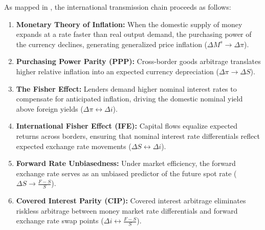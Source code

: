 As mapped in , the international transmission chain proceeds as follows:
\begin{enumerate}[leftmargin=*, label=\arabic*.]
    \item \textbf{Monetary Theory of Inflation:} When the domestic supply of money expands at a rate faster than real output demand, the purchasing power of the currency declines, generating generalized price inflation ($\Delta M^s \to \Delta \pi$).
    \item \textbf{Purchasing Power Parity (PPP):} Cross-border goods arbitrage translates higher relative inflation into an expected currency depreciation ($\Delta \pi \to \Delta S$).
    \item \textbf{The Fisher Effect:} Lenders demand higher nominal interest rates to compensate for anticipated inflation, driving the domestic nominal yield above foreign yields ($\Delta \pi \leftrightarrow \Delta i$).
    \item \textbf{International Fisher Effect (IFE):} Capital flows equalize expected returns across borders, ensuring that nominal interest rate differentials reflect expected exchange rate movements ($\Delta S \leftrightarrow \Delta i$).
    \item \textbf{Forward Rate Unbiasedness:} Under market efficiency, the forward exchange rate serves as an unbiased predictor of the future spot rate ($\Delta S \to \frac{F-S}{S}$).
    \item \textbf{Covered Interest Parity (CIP):} Covered interest arbitrage eliminates riskless arbitrage between money market rate differentials and forward exchange rate swap points ($\Delta i \leftrightarrow \frac{F-S}{S}$).
\end{enumerate}


